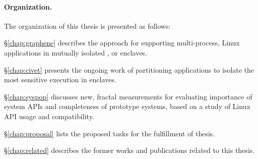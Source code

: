 \paragraph{Organization.}
The organization of this thesis is presented as follows:
\begin{compactitem}
\item \S\ref{chap:graphene}
describes the \graphene{} approach for supporting multi-process, Linux applications in mutually isolated \picoprocs{},
or enclaves.
\item \S\ref{chap:civet}
presents the ongoing work of partitioning
\java{} applications to isolate the most sensitive execution
in enclaves.
\item \S\ref{chap:syspop}
discusses new, fractal measurements for evaluating importance of system APIs and completeness of prototype systems,
based on a study of Linux API usage and compatibility.
\item \S\ref{chap:proposal}
lists the proposed tasks for the fulfillment of thesis.
\item \S\ref{chap:related}
describes the former works and publications related to
this thesis.
\end{compactitem}

